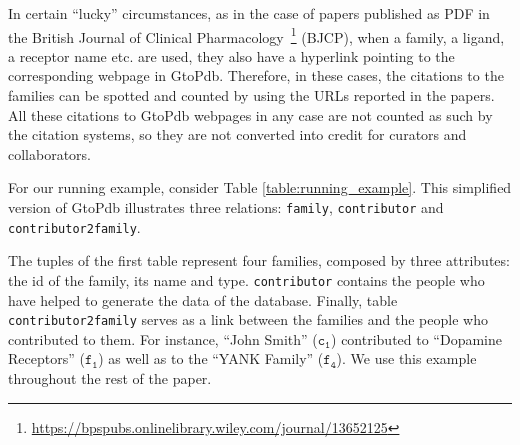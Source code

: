 In certain ``lucky'' circumstances, as in the case of papers published as PDF in the British Journal of Clinical Pharmacology~\footnote{\url{https://bpspubs.onlinelibrary.wiley.com/journal/13652125}} (BJCP), when a  family, a ligand, a receptor name etc. are used, they also have a hyperlink pointing to the corresponding webpage in GtoPdb. Therefore, in these cases, the citations to the families can be spotted and counted by using the URLs reported in the papers.
All these citations to GtoPdb webpages in any case are not counted as such by the citation systems, so they are not converted into credit for curators and collaborators. 

For our running example, consider Table \ref{table:running_example}. This simplified version of GtoPdb illustrates three relations: \texttt{family}, \texttt{contributor} and \texttt{contributor2family}.

The tuples of the first table represent four families, composed by three attributes: the id of the family, its name and type. 
\texttt{contributor} contains the people who have helped to generate the data  of the database.
Finally, table \texttt{contributor2family} serves as a link between the families and the people who contributed to them.
For instance, ``John Smith'' ($\mathtt{c_1}$) contributed to ``Dopamine Receptors'' ($\mathtt{f_1}$) as well as to the ``YANK Family'' ($\mathtt{f_4}$). We use this example throughout the rest of the paper.

